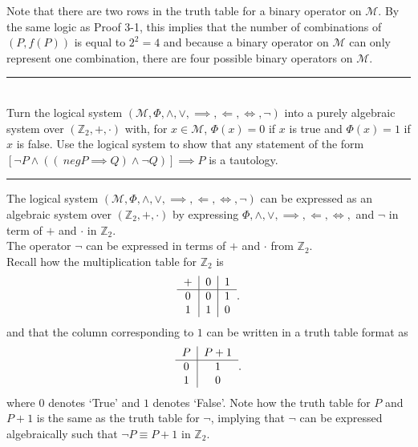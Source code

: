 \documentclass{article}
\begin{document}
Note that there are two rows in the truth table for a binary operator on $\mathcal{M}$. By the same logic as Proof 3-1, this implies that the number of combinations of $(P, f(P))$ is equal to $2^2 = 4$ and because a binary operator on $\mathcal{M}$ can only represent one combination, there are four possible binary operators on $\mathcal{M}$.
\\[0.05in]\rule{\textwidth}{0.4pt} 
\\[0.05in] Turn the logical system $(\mathcal{M}, \Phi, \wedge, \vee, \implies, \Longleftarrow, \Longleftrightarrow, \neg)$ into a purely algebraic system over $(\mathbb{Z}_2, +,\cdot)$ with, for $x \in \mathcal{M}$, $\Phi(x) = 0$ if $x$ is true and $\Phi(x) = 1$ if $x$ is false.  Use the logical system to show that any statement of the form $[\neg P \wedge ((\ neg P \implies Q) \wedge \neg Q)] \implies P$ is a tautology.
\\[0.05in]\rule{\textwidth}{0.4pt} 
The logical system $(\mathcal{M}, \Phi, \wedge, \vee, \implies, \Longleftarrow, \Longleftrightarrow, \neg)$ can be expressed as an algebraic system over $(\mathbb{Z}_2, + ,\cdot)$ by expressing $\Phi, \wedge, \vee, \implies, \Longleftarrow, \Longleftrightarrow,$ and $\neg$ in term of $+$ and $\cdot$ in $\mathbb{Z}_2$.
\\[0.05in] The operator $\neg$ can be expressed in terms of $+$ and $\cdot$ from $\mathbb{Z}_2$. 
\\[0.05in] Recall how the multiplication table for $\mathbb{Z}_2$ is
\begin{equation*}
\begin{tabular}{c | c | c}
+ & 0 & 1 \\ \hline
0 & 0 & 1 \\ 
1 & 1 & 0 \\
\end{tabular}.
\end{equation*}
and that the column corresponding to $1$ can be written in a truth table format as
\begin{equation*}
\begin{tabular}{c | c}
$P$ & $P+1$ \\ \hline
0 & 1 \\ 
1 & 0 \\
\end{tabular}.
\end{equation*}
where $0$ denotes `True' and $1$ denotes `False'.  Note how the truth table for $P$ and $P+1$ is the same as the truth table for $\neg$, implying that $\neg$ can be expressed algebraically such that $\neg P \equiv P + 1$ in $\mathbb{Z}_2$.
\end{document}
